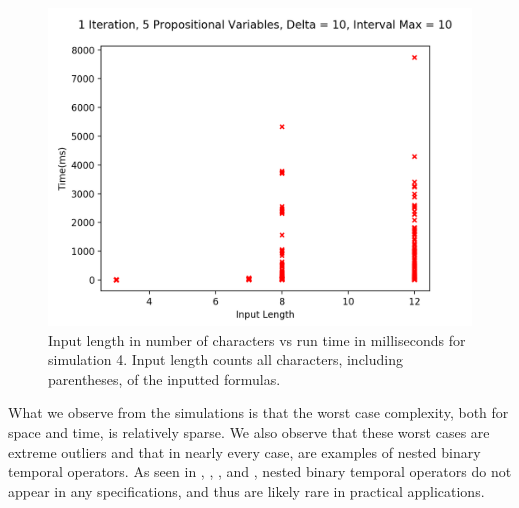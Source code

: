 \documentclass[runningheads]{llncs}
\begin{document}
\begin{figure}[H]
    \centering
    \includegraphics[scale=0.75]{images/Sim4Time.png}
    \caption{Input length in number of characters vs run time in milliseconds for simulation 4. Input length counts all characters, including parentheses, of the inputted formulas.}
\end{figure}
\noindent What we observe from the simulations is that the worst case complexity, both for space and time, is relatively sparse. We also observe that these worst cases are extreme outliers and that in nearly every case, are examples of nested binary temporal operators. As seen in \cite{HLR21}, \cite{KZJZR20}, \cite{AJR22}, and \cite{HCHJR21}, nested binary temporal operators do not appear in any specifications, and thus are likely rare in practical applications.
\end{document}
